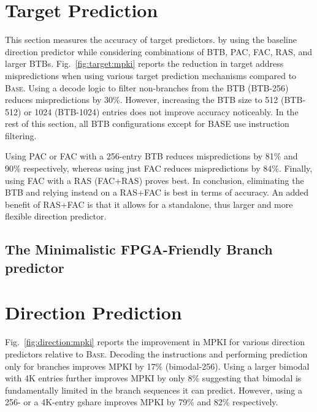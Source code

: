 \section{Target Prediction}
\label{sec:eval:target}

This section measures the accuracy of target predictors. by using the baseline direction predictor while considering combinations of BTB, PAC, FAC, RAS, and larger BTBs. Fig.~\ref{fig:target:mpki} reports the reduction in target address mispredictions when using various target prediction mechanisms compared to \textsc{Base}. Using a decode logic to filter non-branches from the BTB (BTB-256) reduces mispredictions by 30\%. However, increasing the BTB size to 512 (BTB-512) or 1024 (BTB-1024) entries does not improve accuracy noticeably. In the rest of this section, all BTB configurations except for BASE use instruction filtering.

Using PAC or FAC with a 256-entry BTB reduces mispredictions by 81\% and 90\% respectively, whereas using just FAC reduces mispredictions by 84\%. Finally, using FAC with a RAS (FAC+RAS) proves best. In conclusion, eliminating the BTB and relying instead on a RAS+FAC is best in terms of accuracy. An added benefit of RAS+FAC is that it allows for a standalone, thus larger and more flexible direction predictor. 


\subsection{The Minimalistic FPGA-Friendly Branch predictor}
\label{sec:eval:min}

\section{Direction Prediction}
\label{sec:eval:min:direction}
Fig.~\ref{fig:direction:mpki} reports the improvement in MPKI for various direction predictors relative to \textsc{Base}. Decoding the instructions and performing prediction only for branches improves MPKI by 17\% (bimodal-256). Using a larger bimodal with 4K entries further improves MPKI by only 8\% suggesting that bimodal is fundamentally limited in the branch sequences it can predict. However, using a 256- or a 4K-entry gshare improves MPKI by 79\% and 82\% respectively. 

